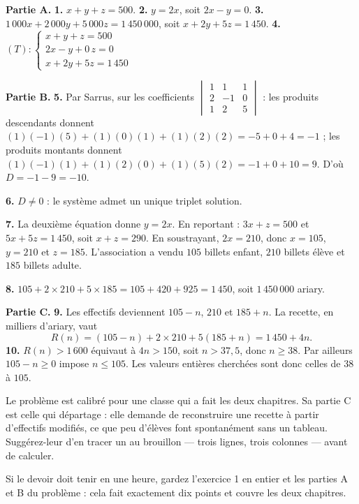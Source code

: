 \begin{corrige}
\textbf{Partie A.}
\textbf{1.} $x+y+z = 500$.
\textbf{2.} $y = 2x$, soit $2x-y = 0$.
\textbf{3.} $1\,000x+2\,000y+5\,000z = 1\,450\,000$, soit
$x+2y+5z = 1\,450$.
\textbf{4.}
$(T) : \begin{cases} x+y+z = 500\\ 2x-y+0\,z = 0\\ x+2y+5z = 1\,450
\end{cases}$

\textbf{Partie B.}
\textbf{5.} Par Sarrus, sur les coefficients
$\begin{vmatrix} 1 & 1 & 1\\ 2 & -1 & 0\\ 1 & 2 & 5\end{vmatrix}$ :
les produits descendants donnent $(1)(-1)(5)+(1)(0)(1)+(1)(2)(2) = -5+0+4
= -1$ ; les produits montants donnent
$(1)(-1)(1)+(1)(2)(0)+(1)(5)(2) = -1+0+10 = 9$. D'où $D = -1-9 = -10$.

\textbf{6.} $D \neq 0$ : le système admet un unique triplet solution.

\textbf{7.} La deuxième équation donne $y = 2x$. En reportant :
$3x+z = 500$ et $5x+5z = 1\,450$, soit $x+z = 290$. En soustrayant,
$2x = 210$, donc $x = 105$, $y = 210$ et $z = 185$. L'association a vendu
$105$ billets enfant, $210$ billets élève et $185$ billets adulte.

\textbf{8.} $105+2\times210+5\times185 = 105+420+925 = 1\,450$, soit
$1\,450\,000$ ariary. \checkmark

\textbf{Partie C.}
\textbf{9.} Les effectifs deviennent $105-n$, $210$ et $185+n$. La recette,
en milliers d'ariary, vaut
\[
  R(n) = (105-n)+2\times210+5(185+n) = 1\,450+4n .
\]
\textbf{10.} $R(n) > 1\,600$ équivaut à $4n > 150$, soit $n > 37{,}5$, donc
$n \geq 38$. Par ailleurs $105-n \geq 0$ impose $n \leq 105$. Les valeurs
entières cherchées sont donc celles de $38$ à $105$.
\end{corrige}

\begin{notepourlaclasse}
Le problème est calibré pour une classe qui a fait les deux chapitres. Sa
partie C est celle qui départage : elle demande de reconstruire une recette
à partir d'effectifs modifiés, ce que peu d'élèves font spontanément sans un
tableau. Suggérez-leur d'en tracer un au brouillon — trois lignes, trois
colonnes — avant de calculer.

Si le devoir doit tenir en une heure, gardez l'exercice 1 en entier et les
parties A et B du problème : cela fait exactement dix points et couvre les
deux chapitres.
\end{notepourlaclasse}
